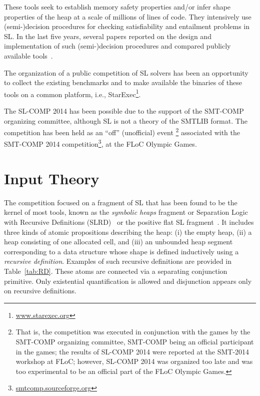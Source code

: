 \documentclass[twoside,11pt]{article}
\begin{document}
These tools seek to establish memory safety properties and/or infer shape properties of the heap at a scale of millions of lines of code.
They intensively use (semi-)decision procedures for checking satisfiability and entailment problems in SL.
In the last five years, several papers reported on the design and implementation of such (semi-)decision procedures and compared publicly available tools~\cite{HasseIOP13}.

The organization of a public competition of SL solvers has been an opportunity 
to collect the existing benchmarks and  
to make available the binaries of these tools on a common platform, i.e., StarExec\footnote{\url{www.starexec.org}}.

The SL-COMP 2014 has been possible due to the support of the SMT-COMP organizing committee, 
although SL is not a theory of the SMTLIB format.
The competition has been held as an ``off'' (unofficial) event \footnote{That is, the competition was executed in conjunction with the games by the SMT-COMP organizing committee, SMT-COMP being an official participant in the games; the results of SL-COMP 2014 were reported at the SMT-2014 workshop at FLoC; however, SL-COMP 2014 was organized too late and was too experimental to be an official part of the FLoC Olympic Games.}
associated with the SMT-COMP 2014 competition\footnote{\url{smtcomp.sourceforge.org}}, at the FLoC Olympic Games.


\section{Input Theory}

The competition focused on a fragment of SL that has been found to be the kernel of most tools, known 
as
the \emph{symbolic heaps} fragment
or Separation Logic with Recursive Definitions (SLRD)~\cite{IosifRS13} or
the positive flat SL fragment~\cite{AntonopoulosGHKO14}. 
It includes three kinds of atomic propositions describing the heap:
(i) the empty heap, 
(ii) a heap consisting of one allocated cell, and
(iii) an unbounded heap segment corresponding to a data structure whose shape is defined inductively using a \emph{recursive definition}. 
Examples of such recursive definitions are provided in Table~\ref{tab:RD}.
These atoms are connected via a separating conjunction primitive. 
Only existential quantification is allowed and 
disjunction appears only on recursive definitions. 
\end{document}
